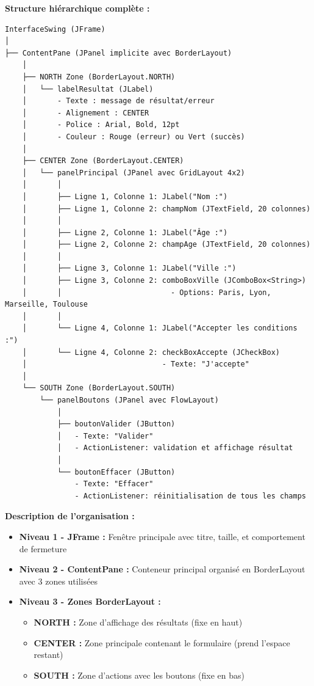 \documentclass[11pt,a4paper]{article}
\begin{document}
\begin{correctionbox}
\textbf{Structure hiérarchique complète :}

\begin{verbatim}
InterfaceSwing (JFrame)
│
├── ContentPane (JPanel implicite avec BorderLayout)
    │
    ├── NORTH Zone (BorderLayout.NORTH)
    │   └── labelResultat (JLabel)
    │       - Texte : message de résultat/erreur
    │       - Alignement : CENTER
    │       - Police : Arial, Bold, 12pt
    │       - Couleur : Rouge (erreur) ou Vert (succès)
    │
    ├── CENTER Zone (BorderLayout.CENTER)
    │   └── panelPrincipal (JPanel avec GridLayout 4x2)
    │       │
    │       ├── Ligne 1, Colonne 1: JLabel("Nom :")
    │       ├── Ligne 1, Colonne 2: champNom (JTextField, 20 colonnes)
    │       │
    │       ├── Ligne 2, Colonne 1: JLabel("Âge :")
    │       ├── Ligne 2, Colonne 2: champAge (JTextField, 20 colonnes)
    │       │
    │       ├── Ligne 3, Colonne 1: JLabel("Ville :")
    │       ├── Ligne 3, Colonne 2: comboBoxVille (JComboBox<String>)
    │       │                         - Options: Paris, Lyon, Marseille, Toulouse
    │       │
    │       └── Ligne 4, Colonne 1: JLabel("Accepter les conditions :")
    │       └── Ligne 4, Colonne 2: checkBoxAccepte (JCheckBox)
    │                               - Texte: "J'accepte"
    │
    └── SOUTH Zone (BorderLayout.SOUTH)
        └── panelBoutons (JPanel avec FlowLayout)
            │
            ├── boutonValider (JButton)
            │   - Texte: "Valider"
            │   - ActionListener: validation et affichage résultat
            │
            └── boutonEffacer (JButton)
                - Texte: "Effacer"
                - ActionListener: réinitialisation de tous les champs
\end{verbatim}

\textbf{Description de l'organisation :}

\begin{itemize}
    \item \textbf{Niveau 1 - JFrame :} Fenêtre principale avec titre, taille, et comportement de fermeture
    
    \item \textbf{Niveau 2 - ContentPane :} Conteneur principal organisé en BorderLayout avec 3 zones utilisées
    
    \item \textbf{Niveau 3 - Zones BorderLayout :}
    \begin{itemize}
        \item \textbf{NORTH :} Zone d'affichage des résultats (fixe en haut)
        \item \textbf{CENTER :} Zone principale contenant le formulaire (prend l'espace restant)
        \item \textbf{SOUTH :} Zone d'actions avec les boutons (fixe en bas)
    \end{itemize}
    

\end{itemize}
\end{correctionbox}
\end{document}
